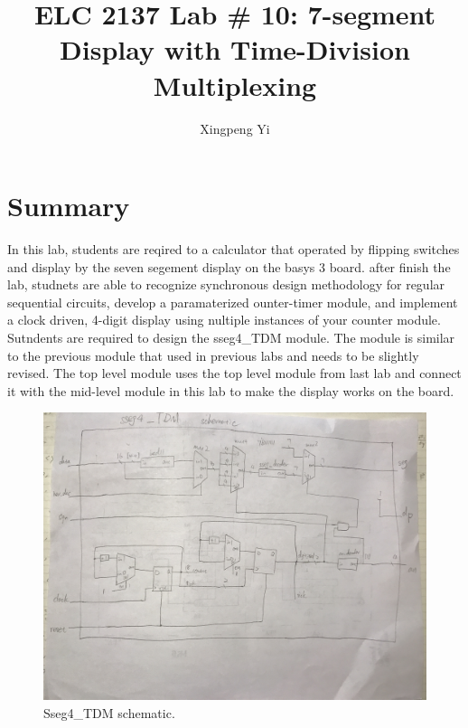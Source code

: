 \documentclass[11pt]{article}
\begin{document}
\title{ELC 2137 Lab \# 10: 
	7-segment Display with Time-Division Multiplexing}
\author{Xingpeng Yi}

\maketitle


\section*{Summary}

In this lab, students are reqired to a calculator that operated by flipping switches and display by the seven segement display on the basys 3 board. after finish the lab, studnets are able to recognize synchronous design methodology for regular sequential circuits, develop a paramaterized ounter-timer module, and implement a clock driven, 4-digit display using nultiple instances of your counter module. 
Sutndents are required to design the sseg4\_TDM module. The module is similar to the previous module that used in previous labs and needs to be slightly revised. The top level module uses the top level module from last lab and connect it with the mid-level module in this lab to make the display works on the board.

\begin{figure}[ht]\centering
	\includegraphics[width=\textwidth]{ssegTDM}
	\caption{Sseg4\_TDM schematic.}
	\label{fig:sseg4_TDM}			%
\end{figure}
\end{document}

